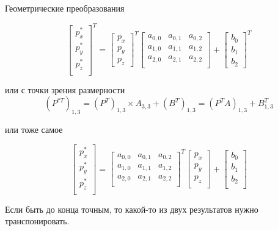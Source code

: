 \documentclass{beamer}
\begin{document}
\begin{frame}{Геометрические преобразования}
{		\[
			\begin{bmatrix}
				p_x^{*} \\
				p_y^{*} \\
				p_z^{*} \\
			\end{bmatrix}^T
			=
			\begin{bmatrix}
				p_x \\
				p_y \\
				p_z
			\end{bmatrix}^T
			\begin{bmatrix}
				a_{0,0} & a_{0,1} & a_{0,2}  \\
				a_{1,0} & a_{1,1} & a_{1,2}  \\
				a_{2,0} & a_{2,1} & a_{2,2}  \\
			\end{bmatrix}
			+
			\begin{bmatrix}
				b_0 \\
				b_1 \\
				b_2
			\end{bmatrix}^T
		\]

		или с точки зрения размерности
		\[
			(P^{*T})_{1,3}
			=(P^T)_{1,3} \times A_{3,3}+(B^T)_{1,3} 
			=(P^TA)_{1,3}+B_{1,3}^T 
			\]

		или тоже самое

		\[
			\begin{bmatrix}
				p_x^{*} \\
				p_y^{*} \\
				p_z^{*} \\
			\end{bmatrix}
			=
			\begin{bmatrix}
				a_{0,0} & a_{0,1} & a_{0,2}  \\
				a_{1,0} & a_{1,1} & a_{1,2}  \\
				a_{2,0} & a_{2,1} & a_{2,2}  \\
			\end{bmatrix}^T
			\begin{bmatrix}
				p_x \\
				p_y \\
				p_z \\
			\end{bmatrix}
			+
			\begin{bmatrix}
				b_0 \\
				b_1 \\
				b_2 \\
			\end{bmatrix}
		\]

		Если быть до конца точным, то какой-то из двух результатов нужно транспонировать.
		}
	\end{frame}
\end{document}
